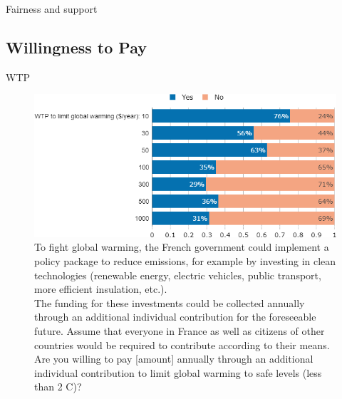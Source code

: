 \begin{framefont}{\small}
\begin{frame}{Fairness and support}
\end{frame}

 \subsection{Willingness to Pay}

\begin{frame}{WTP}%
 \begin{figure}[h!]
 \centering
 \caption{To fight global warming, the French government could implement a policy package to reduce emissions, for example by investing in clean technologies (renewable energy, electric vehicles, public transport, more efficient insulation, etc.). \\
 The funding for these investments could be collected annually through an additional individual contribution for the foreseeable future. Assume that everyone in France as well as citizens of other countries would be required to contribute according to their means. \\ Are you willing to pay [amount] annually through an additional individual contribution to limit global warming to safe levels (less than 2 \degree{}C)?}
 \includegraphics[width=.61\paperwidth]{../figures/FR/wtp_FR.png} %
 \end{figure}
 \end{frame}


\end{framefont}
